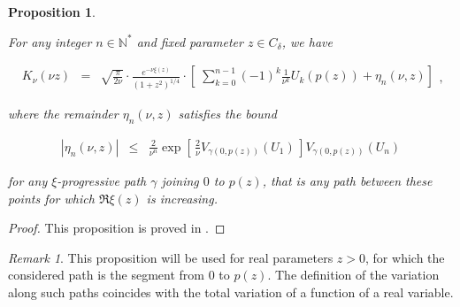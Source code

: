 \documentclass{jams-l}
\newtheorem{proposition}[theorem]{Proposition}
\theoremstyle{definition}
\theoremstyle{remark}
\newtheorem{remark}[theorem]{Remark}
\numberwithin{equation}{section}
\begin{document}
        \begin{proposition}
        \label{PropAsymptoticExpansionModifiedBessel}
        
            For any integer $n \in \mathbb{N}^{\ast}$ and fixed parameter $z \in C_{\delta}$, we have
            
            \[ \begin{array}{lll}
                    K_ {\nu} \left( \nu z \right) & = & \sqrt{\frac{\pi}{2 \nu}} \cdot \frac{e^{- \nu \xi \left( z \right)}}{\left( 1 + z^2 \right)^{1/4}} \cdot \left[ \; \sum\limits_{k=0}^{n-1} \left( -1 \right)^k \frac{1}{\nu^k} U_k \left( p \left( z \right) \right) + \eta_n \left( \nu, z \right) \right]
                \end{array} , \]
            
            \noindent where the remainder $\eta_n \left( \nu, z \right)$ satisfies the bound
            
            \[ \begin{array}{lll}
                    \left \vert \eta_n \left( \nu, z \right) \right \vert & \leqslant & \frac{2}{\nu^n} \exp \left[ \, \frac{2}{\nu} V_{\gamma \left( 0, p \left( z \right) \right)} \left( U_1 \right) \, \right]  V_{\gamma \left( 0, p \left( z \right) \right)} \left( U_n \right)
                \end{array} \]
            
            \noindent for any $\xi$-progressive path $\gamma$ joining $0$ to $p \left( z \right)$, that is any path between these points for which $\Re \xi \left( z \right)$ is increasing.
        
        \end{proposition}
        
        \begin{proof}
        
            This proposition is proved in \cite[Sec. 10.7]{MR1429619}.
        
        \end{proof}
        
        \begin{remark}
        
            This proposition will be used for real parameters $z > 0$, for which the considered path is the segment from $0$ to $p \left( z \right)$. The definition of the variation along such paths coincides with the total variation of a function of a real variable.
        
        \end{remark}
        
\end{document}
